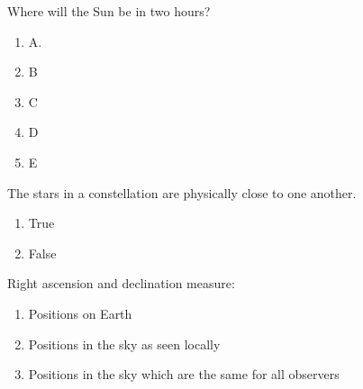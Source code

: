 \documentclass[11pt]{article}
\begin{document}
\begin{enumerate}
\begin{minipage}{\textwidth}
\begin{minipage}{\textwidth}
\item Where will the Sun be in two hours?
\begin{multicols}{3}
\begin{enumerate} 
\setlength{\itemsep}{1pt} 
\setlength{\parskip}{0pt} 
\setlength{\parsep}{0pt}
\setlength{\multicolsep}{1pt} 
\item A.
\item B
\item C
\item D
\item E
\end{enumerate} 
\vfill 
\end{multicols}

\end{minipage}
\end{minipage}
\vskip 0.20in

\begin{minipage}{\textwidth}
\begin{minipage}{\textwidth}
\item The stars in a constellation are physically close to one another.
\begin{multicols}{3}
\begin{enumerate} 
\setlength{\itemsep}{1pt} 
\setlength{\parskip}{0pt} 
\setlength{\parsep}{0pt}
\setlength{\multicolsep}{1pt} 
\item True
\item False
\end{enumerate} 
\vfill 
\end{multicols}

\end{minipage}
\end{minipage}
\vskip 0.20in

\begin{minipage}{\textwidth}
\begin{minipage}{\textwidth}
\item Right ascension and declination measure:
\begin{enumerate} 
\setlength{\itemsep}{1pt} 
\setlength{\parskip}{0pt} 
\setlength{\parsep}{0pt}
\setlength{\multicolsep}{1pt} 
\item Positions on Earth
\item Positions in the sky as seen locally
\item Positions in the sky which are the same for all observers
\end{enumerate} 
\end{minipage}
\end{minipage}
\vskip 0.20in


\end{enumerate}
\end{document}
